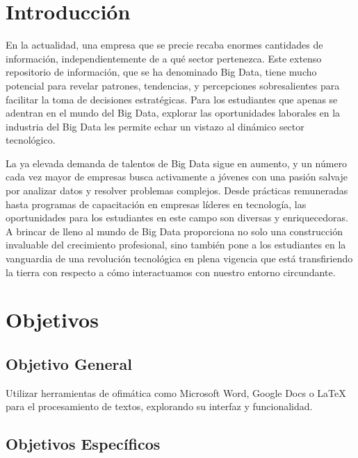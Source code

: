 \documentclass[12pt]{article}
\begin{document}
    

    \tableofcontents
    \newpage

    \section{Introducción}
        
        En la actualidad, una empresa que se precie recaba enormes cantidades de información, independientemente de a qué sector pertenezca. Este extenso repositorio de información, que se ha denominado Big Data, tiene mucho potencial para revelar patrones, tendencias, y percepciones sobresalientes para facilitar la toma de decisiones estratégicas. Para los estudiantes que apenas se adentran en el mundo del Big Data, explorar las oportunidades laborales en la industria del Big Data les permite echar un vistazo al dinámico sector tecnológico.
    
        La ya elevada demanda de talentos de Big Data sigue en aumento, y un número cada vez mayor de empresas busca activamente a jóvenes con una pasión salvaje por analizar datos y resolver problemas complejos. Desde prácticas remuneradas hasta programas de capacitación en empresas líderes en tecnología, las oportunidades para los estudiantes en este campo son diversas y enriquecedoras. A brincar de lleno al mundo de Big Data proporciona no solo una construcción invaluable del crecimiento profesional, sino también pone a los estudiantes en la vanguardia de una revolución tecnológica en plena vigencia que está transfiriendo la tierra con respecto a cómo interactuamos con nuestro entorno circundante.

    \section{Objetivos}
        \subsection{Objetivo General}

            Utilizar herramientas de ofimática como Microsoft Word, Google Docs o LaTeX para el procesamiento de textos, explorando su interfaz y funcionalidad.
        
        \subsection{Objetivos Específicos}
\end{document}
